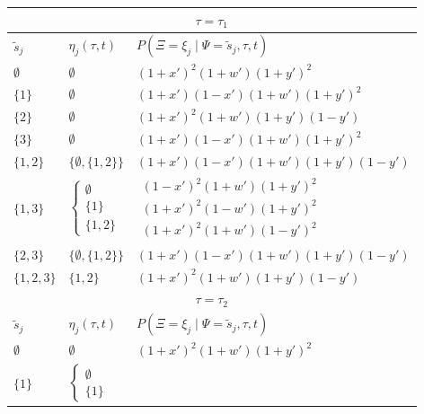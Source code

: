 \documentclass{article}
\newcommand{\siteSplit}{\tilde{s}}
\newcommand{\ancestralSplitPartition}{\eta}
\newcommand{\siteSplitRV}{\Psi}
\newcommand{\ancestralSplitRV}{\Xi}
\begin{document}
\begin{table}
\centering
\begin{tabular}{|l|ll|}
    \multicolumn{3}{c}{$\tau=\tau_1$}\\
    \hline
    $\siteSplit_j$    & $\ancestralSplitPartition_j(\tau, t)$ & $P(\ancestralSplitRV=\xi_j \mid \siteSplitRV=\siteSplit_j,\tau,t)$\\
    \hline
    $\emptyset$&
    $\emptyset$&
    $(1+x')^2   (1+w')(1+y')^2$\\
     $\{1\}$    &
    $\emptyset$&
    $(1+x')(1-x')(1+w')(1+y')^2$\\
     $\{2\}$    &
    $\emptyset$&
    $(1+x')^2   (1+w')(1+y')(1-y')$\\
     $\{3\}$    &
    $\emptyset$&
    $(1+x')(1-x')(1+w')(1+y')^2$\\
    $\{1,2\}$  &
    $\{\emptyset,\{1,2\}\}$&
    $(1+x')(1-x')(1+w')(1+y')(1-y')$\\
    $\{1,3\}$  &
    $\left\{\begin{array}{l}
                    \emptyset\\
                    \{1\}\\
                    \{1,2\}
                \end{array}\right.$&
    $\begin{array}{l}
                    (1-x')^2   (1+w')(1+y')^2\\
                    (1+x')^2   (1-w')(1+y')^2\\
                    (1+x')^2   (1+w')(1-y')^2
                \end{array}$\\
    $\{2,3\}$  &
                $\{\emptyset,\{1,2\}\}$&
                $(1+x')(1-x')(1+w')(1+y')(1-y')$\\
    $\{1,2,3\}$&
                $\{1,2\}$&
                $(1+x')^2   (1+w')(1+y')(1-y')$\\
    \hline
    \multicolumn{3}{c}{$\tau=\tau_2$}\\
    \hline
    $\siteSplit_j$    & $\ancestralSplitPartition_j(\tau, t)$ & $P(\ancestralSplitRV=\xi_j \mid \siteSplitRV=\siteSplit_j,\tau,t)$\\
    \hline
    $\emptyset$       &$\emptyset$&$(1+x')^2   (1+w')(1+y')^2$\\
    $\{1\}$          &
    $\left\{\begin{array}{l}
                    \emptyset\\
                    \{1\}
                \end{array}\right.$&

\end{tabular}
\end{table}
\end{document}
